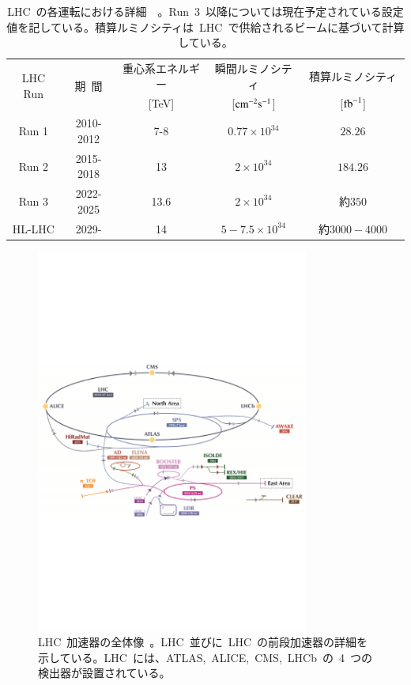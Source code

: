 \begin{table}[tb]
	\centering
	\begin{tabular}{c|cccc}\hline
	    \multirow{2}{*}{LHC Run} & \multirow{2}{*}{期~間} & 重心系エネルギー & 瞬間ルミノシティ & 積算ルミノシティ　\\ 
	     &  & [TeV] & [$\rm{cm}^{-2}\rm{s}^{-1}$] & [$\rm{fb}^{-1}$]　\\ \hline\hline
		Run 1 & 2010-2012 & 7-8 & $0.77\times10^{34}$ & $28.26$ \\ \hline
		Run 2 & 2015-2018 & 13 & $2\times10^{34}$ & $184.26$ \\ \hline
		Run 3 & 2022-2025 & 13.6 & $2\times10^{34}$ & 約$350$ \\\hline
		HL-LHC & 2029- & 14 & $5-7.5\times10^{34}$ & 約$3000-4000$
	\end{tabular}
	\caption[LHC の各運転における詳細]{LHC~の各運転における詳細~\cite{URL:18}~\cite{URL:17}。Run~3~以降については現在予定されている設定値を記している。積算ルミノシティは~LHC~で供給されるビームに基づいて計算している。}
    \label{tb:LHC}
\end{table}

\begin{figure}[H]
        \centering   
        \includegraphics[width=0.8\textwidth]{img/jpeg/lhclhc.pdf}
        \caption[LHC 加速器の全体像]{LHC~加速器の全体像~\cite{URL:01}。LHC~並びに~LHC~の前段加速器の詳細を示している。LHC~には、ATLAS,~ALICE,~CMS,~LHCb~の~4~つの検出器が設置されている。}\label{fig:lhc}
\end{figure}


